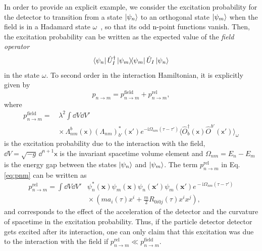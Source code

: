 \documentclass[prd,twocolumn,superscriptaddress,floatfix,amsmath,amssymb,amsfonts,longbibliography,nofootinbib]{revtex4-1}
\newcommand{\mf}{\mathsf}%
\newcommand{\ii}{\mathrm{i}}
\newcommand{\tb}[1]{\textcolor{black}{#1}}
\begin{document}
In order to provide an explicit example, we consider the excitation probability for the detector to transition from a state $\ket{\psi_n}$ to an orthogonal state $\ket{\psi_m}$ when the field is in a Hadamard state $\omega$~\cite{kayWald,fewsterNecessityHadamard}, so that its odd \tb{n-}point functions vanish. Then, the excitation probability can be written as the expected value of the \emph{field operator}
\begin{equation}
    \bra{\psi_n}\hat{U}^\dagger_I\ket{\psi_m}\!\!\bra{\psi_m}\hat{U}_I\ket{\psi_n}
\end{equation}
in the state $\omega$. To second order in the interaction Hamiltonian, it is explicitly given by
\begin{equation}\label{eq:pnm}
    p_{n\rightarrow m} = p_{n\rightarrow m}^{\text{field}} + p_{n\rightarrow m}^{\text{rel}},
\end{equation}
where 
\begin{align}
    p_{n\rightarrow m}^{\text{field}} = &\,\lambda^2 \int \dd V\dd V'\\ &\!\!\!\!\times\Lambda_{nm}^b(\mf x)(\Lambda_{nm})^*_{b'}\!(\mf x')e^{-\ii \Omega_{nm}(\tau-\tau')}\!\langle\hat{O}^\dagger_b(\mf x)\hat{O}^{b'}(\mf x')\rangle_\omega\nonumber
\end{align}
is the excitation probability due to the interaction with the field, $\dd V = \sqrt{-g} \,\dd^{n+1}\mf x$ is the invariant spacetime volume element and $\Omega_{nm} = E_n - E_m$ is the energy gap between the states $\ket{\psi_n}$ and $\ket{\psi_m}$. The term $p_{n\rightarrow m}^{\text{rel}}$ in Eq. \eqref{eq:pnm} can be written as
\begin{align}
    p_{n\rightarrow m}^{\text{rel}} \!= \!\!\int\! \dd V \dd V' &\psi_n^*(\bm x)\psi_m(\bm x) \psi_n(\bm x')\psi_m(\bm x') e^{\!-\ii \Omega_{nm}(\tau-\tau')}\nonumber\\&\!\!\!\!\times\left(ma_i(\tau) x^i + \frac{m}{2}R_{0i0j}(\tau)x^i x^j\right),
\end{align}
and corresponds to the effect of the acceleration of the detector and the curvature of spacetime in the excitation probability. Thus, if the particle detector detector gets excited after its interaction, one can only claim that this excitation was due to the interaction with the field if $p_{n\rightarrow m}^{\text{rel}}\ll p_{n\rightarrow m}^{\text{field}}$.
\end{document}
